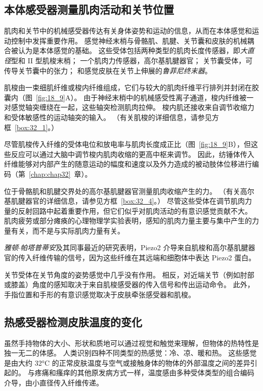 \subsection{本体感受器测量肌肉活动和关节位置}

肌肉和关节中的机械感受器传达有关身体姿势和运动的信息，从而在本体感觉和运动控制中发挥重要作用。
感觉神经末梢与骨骼肌、肌腱、关节囊和皮肤的机械耦合被认为是本体感觉的基础。
这些受体包括两种类型的肌肉长度传感器，即\textit{大直径}型和 II 型肌梭末梢；
一个肌肉力传感器，高尔基肌腱器官；
关节囊受体，可传导关节囊中的张力；
和感觉皮肤在关节上伸展的\textit{鲁菲尼终末器}。


肌梭由一束细肌纤维或梭内纤维组成，它们与较大的肌肉纤维平行排列并封闭在胶囊内（图~\ref{fig:18_9}A）。
由于神经末梢中的机械感受性离子通道，梭内纤维被一对感觉轴突缠绕在一起，这些轴突检测肌肉拉伸。
梭内肌还接收来自调节收缩力和受体敏感性的运动轴突的输入。
（有关肌梭的详细信息，请参见方框~\ref{box:32_1}。）


尽管肌梭传入纤维的受体电位和放电率与肌肉长度成正比（图~\ref{fig:18_9}B），但这些反应可以通过大脑中调节梭内肌肉收缩的更高中枢来调节。
因此，纺锤体传入纤维能够对内部产生的随意运动的幅度和速度以及外力造成的被动肢体位移进行编码（第~\ref{chap:chap32}~章）。


位于骨骼肌和肌腱交界处的高尔基肌腱器官测量肌肉收缩产生的力。
（有关高尔基肌腱器官的详细信息，请参见方框~\ref{box:32_4}。）
尽管这些受体在调节肌肉力量的反射回路中起着重要作用，但它们似乎对肌肉活动的有意识感觉贡献不大。
肌肉疲劳或部分瘫痪的心理物理学实验表明，感知的肌肉力量主要与集中产生的力量有关，而不是与实际肌肉力量有关。


\textit{雅顿$\cdot$帕塔普蒂安}及其同事最近的研究表明，Piezo2 介导来自肌梭和高尔基肌腱器官的传入纤维传输的信号，因为这些纤维在其远端和细胞体中表达 Piezo2 蛋白。


关节受体在关节角度的姿势感觉中几乎没有作用。
相反，对近端关节（例如肘部或膝盖）角度的感知取决于来自肌梭感受器的传入信号和传出运动命令。
此外，手指位置和手形的有意识感觉取决于皮肤牵张感受器和肌梭。



\subsection{热感受器检测皮肤温度的变化}

虽然手持物体的大小、形状和质地可以通过视觉和触觉来理解，但物体的热特性是独一无二的体感。
人类识别四种不同类型的热感觉：冷、凉、暖和热。
这些感觉是由大约 32°C 的正常皮肤温度与空气或接触身体的物体的外部温度之间的差异引起的。
与疼痛和瘙痒的其他原发病方式一样，温度感由多种受体类型的组合编码介导，由小直径传入纤维传递。



